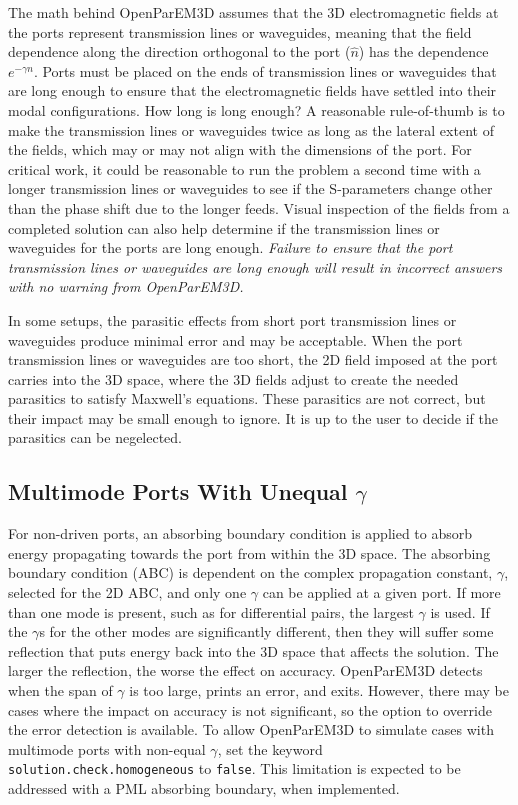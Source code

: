 \documentclass[titlepage]{article}
\renewcommand\_{\textunderscore\linebreak[1]}
\begin{document}
The math behind OpenParEM3D assumes that the 3D electromagnetic fields at the ports represent transmission lines or waveguides, meaning that the field dependence along the direction orthogonal to the port ($\hat{n}$) has the dependence $e^{-\gamma n}$.  Ports must be placed on the ends of transmission lines or waveguides that are long enough to ensure that the electromagnetic fields have settled into their modal configurations.  How long is long enough?  A reasonable rule-of-thumb is to make the transmission lines or waveguides twice as long as the lateral extent of the fields, which may or may not align with the dimensions of the port.  For critical work, it could be reasonable to run the problem a second time with a longer transmission lines or waveguides to see if the S-parameters change other than the phase shift due to the longer feeds.  Visual inspection of the fields from a completed solution can also help determine if the transmission lines or waveguides for the ports are long enough.  \textit{Failure to ensure that the port transmission lines or waveguides are long enough will result in incorrect answers with no warning from OpenParEM3D.}

In some setups, the parasitic effects from short port transmission lines or waveguides produce minimal error and may be acceptable.  When the port transmission lines or waveguides are too short, the 2D field imposed at the port carries into the 3D space, where the 3D fields adjust to create the needed parasitics to satisfy Maxwell's equations.  These parasitics are not correct, but their impact may be small enough to ignore.  It is up to the user to decide if the parasitics can be negelected.

\subsection{Multimode Ports With Unequal $\gamma$}

For non-driven ports, an absorbing boundary condition is applied to absorb energy propagating towards the port from within the 3D space.  The absorbing boundary condition (ABC) is dependent on the complex propagation constant, $\gamma$, selected for the 2D ABC, and only one $\gamma$ can be applied at a given port.  If more than one mode is present, such as for differential pairs, the largest $\gamma$ is used.  If the $\gamma$s for the other modes are significantly different, then they will suffer some reflection that puts energy back into the 3D space that affects the solution.  The larger the reflection, the worse the effect on accuracy.  OpenParEM3D detects when the span of $\gamma$ is too large, prints an error, and exits.  However, there may be cases where the impact on accuracy is not significant, so the option to override the error detection is available.  To allow OpenParEM3D to simulate cases with multimode ports with non-equal $\gamma$, set the keyword \texttt{solution.check.homogeneous} to \texttt{false}.  This limitation is expected to be addressed with a PML absorbing boundary, when implemented.
\end{document}
